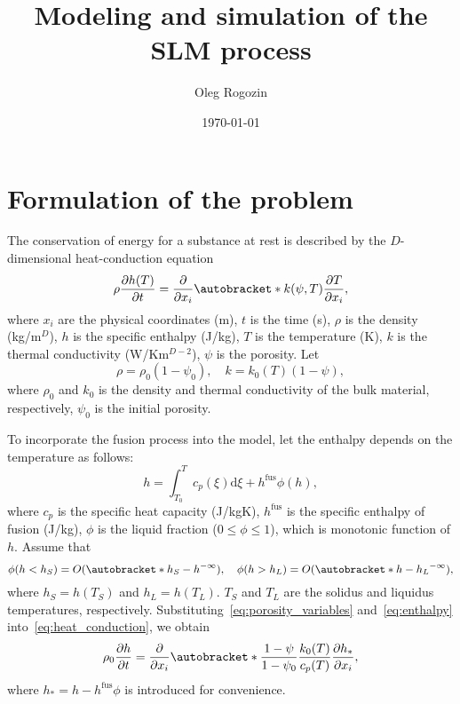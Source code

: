 \documentclass{article}
\title{Modeling and simulation of the SLM process}
\date{\today}
\author{Oleg Rogozin}
\newcommand{\dd}{\mathrm{d}}
\newcommand{\pder}[2][]{\frac{\partial#1}{\partial#2}}
\DeclarePairedDelimiter\autobracket()       %
\newcommand{\br}[1]{\autobracket*{#1}}
\newcommand{\OO}[1]{O(#1)}
\newcommand{\fusion}[1]{{#1}^\mathrm{fus}}
\begin{document}
\maketitle
\tableofcontents

\section{Formulation of the problem}

The conservation of energy for a substance at rest is described by the \(D\)-dimensional heat-conduction equation
\begin{equation}\label{eq:heat_conduction}
	\rho\pder[h(T)]{t} = \pder{x_i}\br{ k(\psi,T)\pder[T]{x_i} },
\end{equation}
where \(x_i\) are the physical coordinates (\si{m}), \(t\) is the time (\si{s}),
\(\rho\) is the density (\si{kg/m}\(^D\)), \(h\) is the specific enthalpy (\si{J/kg}),
\(T\) is the temperature (\si{\K}), \(k\) is the thermal conductivity (\si{W/Km}\(^{D-2}\)),
\(\psi\) is the porosity. Let
\begin{equation}\label{eq:porosity_variables}
	\rho = \rho_0(1-\psi_0), \quad k = k_0(T)(1-\psi),
\end{equation}
where \(\rho_0\) and \(k_0\) is the density and thermal conductivity of the bulk material, respectively,
\(\psi_0\) is the initial porosity.

To incorporate the fusion process into the model, let the enthalpy depends on the temperature as follows:
\begin{equation}\label{eq:enthalpy}
	h = \int_{T_0}^T c_p(\xi)\dd\xi + \fusion{h}\phi(h),
\end{equation}
where \(c_p\) is the specific heat capacity (\si{J/kgK}), \(\fusion{h}\) is the specific enthalpy of fusion (\si{J/kg}),
\(\phi\) is the liquid fraction (\(0 \leq \phi \leq 1\)), which is monotonic function of \(h\).
Assume that
\begin{equation}\label{eq:liquid_fraction}
	\phi(h<h_S) = \OO{\br{h_S-h}^{-\infty}}, \quad \phi(h>h_L) = \OO{\br{h-h_L}^{-\infty}},
\end{equation}
where \(h_S = h(T_S)\) and \(h_L = h(T_L)\).
\(T_S\) and \(T_L\) are the solidus and liquidus temperatures, respectively.
Substituting~\eqref{eq:porosity_variables} and~\eqref{eq:enthalpy} into~\eqref{eq:heat_conduction}, we obtain
\begin{equation}\label{eq:heat_conduction2}
	\rho_0\pder[h]{t} = \pder{x_i}\br{ \frac{1-\psi}{1-\psi_0} \frac{k_0(T)}{c_p(T)}\pder[h_*]{x_i} },
\end{equation}
where \(h_* = h - \fusion{h}\phi\) is introduced for convenience.
\end{document}
